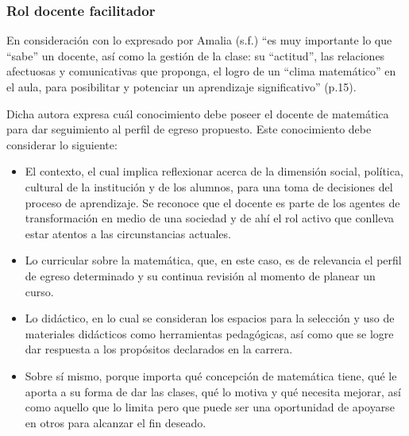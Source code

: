 \subsubsection*{Rol docente facilitador}

En consideración con lo expresado por Amalia (s.f.) “es muy importante lo que “sabe” un docente, así como la gestión de la clase: su “actitud”, las relaciones afectuosas y comunicativas que proponga, el logro de un “clima matemático” en el aula, para posibilitar y potenciar un aprendizaje significativo” (p.15). 

Dicha autora expresa cuál conocimiento debe poseer el docente de matemática para dar seguimiento al perfil de egreso propuesto. Este conocimiento debe considerar lo siguiente: 

\begin{itemize}
    
    \color{blue} \item \color{black} El contexto, el cual implica reflexionar acerca de la dimensión social, política, cultural de la institución y de los alumnos, para una toma de decisiones del proceso de aprendizaje. Se reconoce que el docente es parte de los agentes de transformación en medio de una sociedad y de ahí el rol activo que conlleva estar atentos a las circunstancias actuales. 

     \color{blue} \item \color{black} Lo curricular sobre la matemática, que, en este caso, es de relevancia el perfil de egreso determinado y su continua revisión al momento de planear un curso. 
     
    \color{blue} \item \color{black} Lo didáctico, en lo cual se consideran los espacios para la selección y uso de materiales didácticos como herramientas pedagógicas, así como que se logre dar respuesta a los propósitos declarados en la carrera. 
    
    \color{blue} \item \color{black} Sobre sí mismo, porque importa qué concepción de matemática tiene, qué le aporta a su forma de dar las clases, qué lo motiva y qué necesita mejorar, así como aquello que lo limita pero que puede ser una oportunidad de apoyarse en otros para alcanzar el fin deseado.
    \end{itemize}
    
